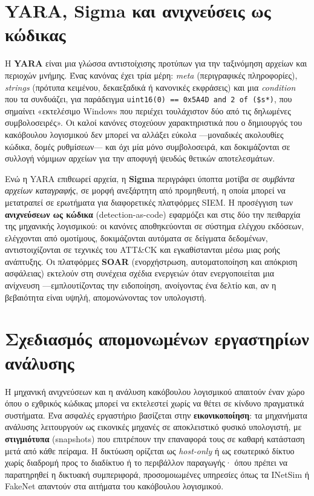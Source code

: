\section{YARA, Sigma και ανιχνεύσεις ως κώδικας}\label{sec:11.4}
Η \textbf{YARA} είναι μια γλώσσα αντιστοίχισης προτύπων για την ταξινόμηση αρχείων και περιοχών μνήμης. Ένας κανόνας έχει τρία μέρη: \emph{meta} (περιγραφικές πληροφορίες), \emph{strings} (πρότυπα κειμένου, δεκαεξαδικά ή κανονικές εκφράσεις) και μια \emph{condition} που τα συνδυάζει, για παράδειγμα \texttt{uint16(0) == 0x5A4D and 2 of (\$s*)}, που σημαίνει «εκτελέσιμο Windows που περιέχει τουλάχιστον δύο από τις δηλωμένες συμβολοσειρές». Οι καλοί κανόνες στοχεύουν χαρακτηριστικά που ο δημιουργός του κακόβουλου λογισμικού δεν μπορεί να αλλάξει εύκολα —μοναδικές ακολουθίες κώδικα, δομές ρυθμίσεων— και όχι μία μόνο συμβολοσειρά, και δοκιμάζονται σε συλλογή νόμιμων αρχείων για την αποφυγή ψευδώς θετικών αποτελεσμάτων.

Ενώ η YARA επιθεωρεί αρχεία, η \textbf{Sigma} περιγράφει ύποπτα μοτίβα σε \emph{συμβάντα αρχείων καταγραφής}, σε μορφή ανεξάρτητη από προμηθευτή, η οποία μπορεί να μετατραπεί σε ερωτήματα για διαφορετικές πλατφόρμες SIEM. Η προσέγγιση των \textbf{ανιχνεύσεων ως κώδικα} (detection-as-code) εφαρμόζει και στις δύο την πειθαρχία της μηχανικής λογισμικού: οι κανόνες αποθηκεύονται σε σύστημα ελέγχου εκδόσεων, ελέγχονται από ομοτίμους, δοκιμάζονται αυτόματα σε δείγματα δεδομένων, αντιστοιχίζονται σε τεχνικές του ATT\&CK και εγκαθίστανται μέσω μιας ροής ανάπτυξης. Οι πλατφόρμες \textbf{SOAR} (ενορχήστρωση, αυτοματοποίηση και απόκριση ασφάλειας) εκτελούν στη συνέχεια σχέδια ενεργειών όταν ενεργοποιείται μια ανίχνευση —εμπλουτίζοντας την ειδοποίηση, ανοίγοντας ένα δελτίο και, αν η βεβαιότητα είναι υψηλή, απομονώνοντας τον υπολογιστή.

\section{Σχεδιασμός απομονωμένων εργαστηρίων ανάλυσης}\label{sec:11.5}
Η μηχανική ανιχνεύσεων και η ανάλυση κακόβουλου λογισμικού απαιτούν έναν χώρο όπου ο εχθρικός κώδικας μπορεί να εκτελεστεί χωρίς να θέτει σε κίνδυνο πραγματικά συστήματα. Ένα ασφαλές εργαστήριο βασίζεται στην \textbf{εικονικοποίηση}: τα μηχανήματα ανάλυσης λειτουργούν ως εικονικές μηχανές σε αποκλειστικό φυσικό υπολογιστή, με \textbf{στιγμιότυπα} (snapshots) που επιτρέπουν την επαναφορά τους σε καθαρή κατάσταση μετά από κάθε πείραμα. Η δικτύωση ορίζεται ως \emph{host-only} ή ως εσωτερικό δίκτυο χωρίς διαδρομή προς το διαδίκτυο ή το περιβάλλον παραγωγής· όπου πρέπει να παρατηρηθεί η δικτυακή συμπεριφορά, προσομοιωμένες υπηρεσίες όπως τα INetSim ή FakeNet απαντούν στα αιτήματα του κακόβουλου λογισμικού.

